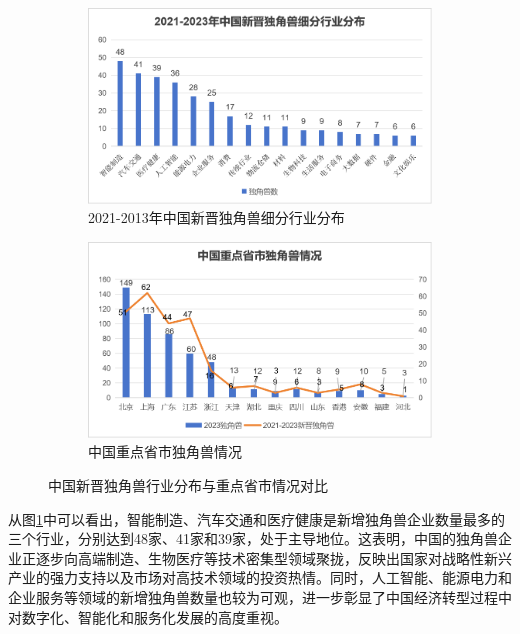 \begin{figure}[H]
    \centering
    \begin{subfigure}[b]{0.45\linewidth} %
        \centering
        \includegraphics[width=\linewidth]{figure/10中国新晋独角兽细分行业分布.png}
        \caption{2021-2013年中国新晋独角兽细分行业分布}
        \label{fig:新晋独角兽行业分布}
    \end{subfigure}
    \hfill %
    \begin{subfigure}[b]{0.45\linewidth}
        \centering
        \includegraphics[width=\linewidth]{figure/11中国重点省市独角兽情况.png}
        \caption{中国重点省市独角兽情况}
        \label{fig:重点省市独角兽}
    \end{subfigure}
    \caption{中国新晋独角兽行业分布与重点省市情况对比}
    \label{fig:独角兽行业与区域分布}
\end{figure}

从图\ref{fig:新晋独角兽行业分布}中可以看出，智能制造、汽车交通和医疗健康是新增独角兽企业数量最多的三个行业，分别达到48家、41家和39家，处于主导地位。这表明，中国的独角兽企业正逐步向高端制造、生物医疗等技术密集型领域聚拢，反映出国家对战略性新兴产业的强力支持以及市场对高技术领域的投资热情。同时，人工智能、能源电力和企业服务等领域的新增独角兽数量也较为可观，进一步彰显了中国经济转型过程中对数字化、智能化和服务化发展的高度重视。

